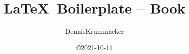 %
\newcommand{\DenKrTPtitle}{%
\LaTeX \ Boilerplate -- Book%
}%
\newcommand{\DenKrTPsubtitle}{%
i.e. big Documents with lots of pages. Additional structuring level "Chapter" available.
}%
\newcommand{\DenKrTPtitleGer}{%
\DenKrTPtitle%
}%
\newcommand{\DenKrTPsubtitleGer}{%
d.h für große Dokumente mit vielen Seiten. Zusätzlich ist das Strukturierungs-Level "Kapitel" verfügbar.
}%
\newcommand{\DenKrTPpublicationType}{Template}%
\newcommand{\DenKrTPpublicationTypeGer}{Template}%
\newcommand{\DenKrTPauthorAnrede}{}%
\newcommand{\DenKrTPauthorTitleBefore}{}%
\newcommand{\DenKrTPauthorTitleAfter}{M.Sc.}%
\newcommand{\DenKrTPauthorFirst}{Dennis}%
\newcommand{\DenKrTPauthorLast}{Krummacker}%
\newcommand{\DenKrTPauthorStreet}{Albert-Schweitzer-Str. 57}%
\newcommand{\DenKrTPauthorPLZ}{67655}%
\newcommand{\DenKrTPauthorCity}{Kaiserslautern}%
\newcommand{\DenKrTPauthorMail}{dennis.krummacker@gmail.com}%
\newcommand{\DenKrTPsignedAtCity}{Kaiserslautern}%
\newcommand{\DenKrTPsupervisorOneAnrede}{}%
\newcommand{\DenKrTPsupervisorOneTitleBefore}{Prof. Dr.-Ing.}%
\newcommand{\DenKrTPsupervisorOneTitleAfter}{}%
\newcommand{\DenKrTPsupervisorOneFirst}{Hans D.}%
\newcommand{\DenKrTPsupervisorOneLast}{Schotten}%
\newcommand{\DenKrTPsupervisorTwoAnrede}{}%
\newcommand{\DenKrTPsupervisorTwoTitleBefore}{Prof. Dr.}%
\newcommand{\DenKrTPsupervisorTwoTitleAfter}{}%
\newcommand{\DenKrTPsupervisorTwoFirst}{FName}%
\newcommand{\DenKrTPsupervisorTwoLast}{LName}%
\newcommand{\DenKrTPsupervisorThreeAnrede}{}%
\newcommand{\DenKrTPsupervisorThreeTitleBefore}{}%
\newcommand{\DenKrTPsupervisorThreeTitleAfter}{}%
\newcommand{\DenKrTPsupervisorThreeFirst}{}%
\newcommand{\DenKrTPsupervisorThreeLast}{}%
\newcommand{\DenKrTPdeanAnrede}{}%
\newcommand{\DenKrTPdeanTitleBefore}{Prof. Dr. rer. nat.}%
\newcommand{\DenKrTPdeanTitleAfter}{}%
\newcommand{\DenKrTPdeanFirst}{Marco}%
\newcommand{\DenKrTPdeanLast}{Rahm}%
\newcommand{\DenKrTPauditchairAnrede}{}%
\newcommand{\DenKrTPauditchairTitleBefore}{Prof. Dr.-Ing.}%
\newcommand{\DenKrTPauditchairTitleAfter}{}%
\newcommand{\DenKrTPauditchairFirst}{Norbert}%
\newcommand{\DenKrTPauditchairLast}{Wehn}%
\newcommand{\DenKrTPoralExamdate}{2022-01-01}%
\newcommand{\DenKrTPdate}{2021-10-11}%
%
%
%
%
%
%
%
\title{\DenKrTPtitle}%
\author{\DenKrTPauthorFirst \DenKrTPauthorLast}%
\date{\copyright \DenKrTPdate}%